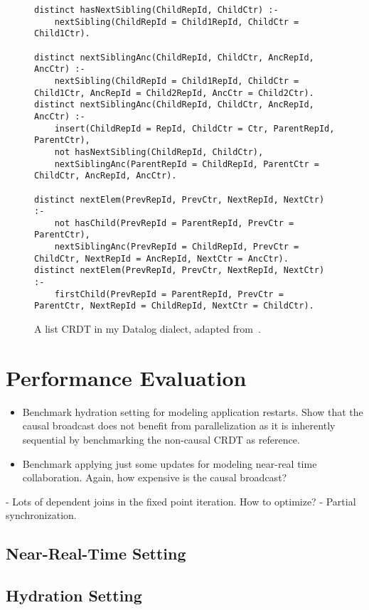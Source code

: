 \begin{figure}[htpb]
\begin{lstlisting}[keepspaces]
distinct hasNextSibling(ChildRepId, ChildCtr) :-
    nextSibling(ChildRepId = Child1RepId, ChildCtr = Child1Ctr).

distinct nextSiblingAnc(ChildRepId, ChildCtr, AncRepId, AncCtr) :-
    nextSibling(ChildRepId = Child1RepId, ChildCtr = Child1Ctr, AncRepId = Child2RepId, AncCtr = Child2Ctr).
distinct nextSiblingAnc(ChildRepId, ChildCtr, AncRepId, AncCtr) :-
    insert(ChildRepId = RepId, ChildCtr = Ctr, ParentRepId, ParentCtr),
    not hasNextSibling(ChildRepId, ChildCtr),
    nextSiblingAnc(ParentRepId = ChildRepId, ParentCtr = ChildCtr, AncRepId, AncCtr).

distinct nextElem(PrevRepId, PrevCtr, NextRepId, NextCtr) :-
    not hasChild(PrevRepId = ParentRepId, PrevCtr = ParentCtr),
    nextSiblingAnc(PrevRepId = ChildRepId, PrevCtr = ChildCtr, NextRepId = AncRepId, NextCtr = AncCtr).
distinct nextElem(PrevRepId, PrevCtr, NextRepId, NextCtr) :-
    firstChild(PrevRepId = ParentRepId, PrevCtr = ParentCtr, NextRepId = ChildRepId, NextCtr = ChildCtr).\end{lstlisting}
	\caption{A list \ac{CRDT} in my Datalog dialect, adapted from~\cite{kleppmann2018data}.}\label{code:list-crdt-datalog-dialect}
\end{figure}

\section{Performance Evaluation}\label{sec:benchmarks}

\begin{itemize}
	\item Benchmark hydration setting for modeling application restarts.
	      Show that the causal broadcast does not benefit from parallelization
	      as it is inherently sequential by benchmarking the non-causal CRDT
	      as reference.
	\item Benchmark applying just some updates for modeling near-real time collaboration.
	      Again, how expensive is the causal broadcast?
\end{itemize}

- Lots of dependent joins in the fixed point iteration. How to optimize?
- Partial synchronization.

\subsection{Near-Real-Time Setting}\label{sec:near-real-time-benchmark}

\subsection{Hydration Setting}\label{sec:hydration-benchmark}

